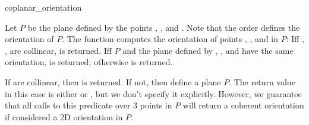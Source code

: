\begin{ccRefFunction}{coplanar_orientation}

         {Let $P$ be the plane defined by the points , ,
          and . Note that the order defines the orientation of
          $P$. The function computes the orientation of points , 
          , and  in $P$: Iff , ,  are
          collinear,  is returned. Iff $P$ and the plane 
          defined by , , and  have the same orientation, 
           is returned; otherwise  is returned.  
          }

{If  are collinear, then  is returned.
If not, then  define a plane $P$.  The return value in this case is
either  or , but we don't specify it explicitly.
However, we guarantee that all calls to this predicate over 3 points in $P$
will return a coherent orientation if considered a 2D orientation in $P$.}

\ccSeeAlso

 \\
 \\
 \\

\end{ccRefFunction}

